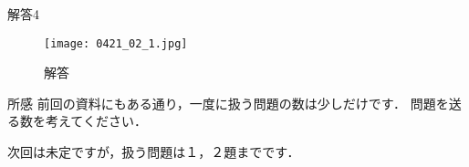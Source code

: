 \documentclass[dvipdfmx]{beamer}
\begin{document}
	\begin{frame}{解答4}
		\begin{figure}[htbp]
			\centering
			\texttt{[image: 0421\_02\_1.jpg]}
			\caption{解答}
			\label{jpg:0421_02_1}
		\end{figure}
	\end{frame}

	\begin{frame}{所感}
		前回の資料にもある通り，一度に扱う問題の数は少しだけです．
		問題を送る数を考えてください．

		次回は未定ですが，扱う問題は１，２題までです．
	\end{frame}
\end{document}

